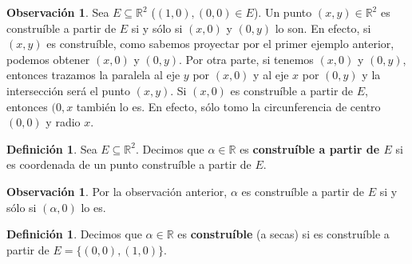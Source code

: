 \documentclass[12pt]{book}
\theoremstyle{definition}
\newtheorem{obs}[teo]{Observación}
\newtheorem{defn}[teo]{Definición}
\newcommand{\RR}{\mathbb{R}}      %
\begin{document}
\begin{obs}
Sea $E\subseteq\RR^2$ ($(1,0),(0,0)\in E$). Un punto $(x,y)\in\RR^2$ es construíble a partir de $E$ si y sólo si $(x,0)$ y $(0,y)$ lo son. En efecto, si $(x,y)$ es construíble, como sabemos proyectar por el primer ejemplo anterior, podemos obtener $(x,0)$ y $(0,y)$. Por otra parte, si tenemos $(x,0)$ y $(0,y)$, entonces trazamos la paralela al eje $y$ por $(x,0)$ y al eje $x$ por $(0,y)$ y la intersección será el punto $(x,y)$.
Si $(x,0)$ es construíble a partir de $E$, entonces $(0,x$ también lo es. En efecto, sólo tomo la circunferencia de centro $(0,0)$ y radio $x$.
\end{obs}

\begin{defn}
Sea $E\subseteq\RR^2$. Decimos que $\alpha\in\RR$ es \textbf{construíble a partir de $E$} si es coordenada de un punto construíble a partir de $E$.
\end{defn}

\begin{obs}
Por la observación anterior, $\alpha$ es construíble a partir de $E$ si y sólo si $(\alpha,0)$ lo es.
\end{obs}

\begin{defn}
Decimos que $\alpha\in\RR$ es \textbf{construíble} (a secas) si es construíble a partir de $E=\{(0,0),(1,0)\}$.
\end{defn}
\end{document}
